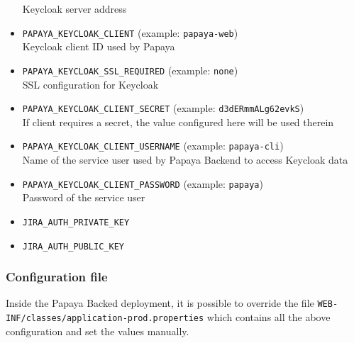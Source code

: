 \begin{itemize}
    Keycloak server address
    \item \texttt{PAPAYA\_KEYCLOAK\_CLIENT} (example: \texttt{papaya-web}) \\
    Keycloak client ID used by Papaya
    \item \texttt{PAPAYA\_KEYCLOAK\_SSL\_REQUIRED} (example: \texttt{none}) \\
    SSL configuration for Keycloak
    \item \texttt{PAPAYA\_KEYCLOAK\_CLIENT\_SECRET} (example: \texttt{d3dERmmALg62evkS}) \\
    If client requires a secret, the value configured here will be used therein
    \item \texttt{PAPAYA\_KEYCLOAK\_CLIENT\_USERNAME} (example: \texttt{papaya-cli}) \\
    Name of the service user used by Papaya Backend to access Keycloak data
    \item \texttt{PAPAYA\_KEYCLOAK\_CLIENT\_PASSWORD} (example: \texttt{papaya}) \\
    Password of the service user
    \item \texttt{JIRA\_AUTH\_PRIVATE\_KEY}  \\
    \item \texttt{JIRA\_AUTH\_PUBLIC\_KEY}  \\
\end{itemize}

\subsubsection*{Configuration file}

Inside the Papaya Backed deployment, it is possible to override the file
\texttt{WEB-INF/classes/application-prod.properties}
which contains all the above configuration and set the values manually.
